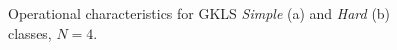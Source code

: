\documentclass[runningheads]{llncs}
\begin{document}
\begin{figure}
\begin{minipage}{0.5\linewidth}
\end{minipage}
\hfill
\begin{minipage}{0.5\linewidth}
\end{minipage}
\caption{Operational characteristics for GKLS \textit{Simple} (a) and \textit{Hard} (b) classes, $N=4$.}
\label{oper4}
\end{figure}
\end{document}
